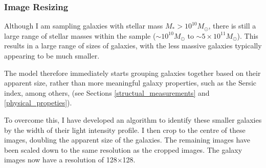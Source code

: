 \documentclass[12pt, onecolumn]{article}
\begin{document}
            
    
        \subsubsection{Image Resizing}
        

            Although I am sampling galaxies with stellar mass $M_{*} > 10^{10} M_{\odot}$, there is still a large range of stellar masses within the sample ($\sim 10^{10} M_{\odot}$ to $\sim 5\times10^{11} M_{\odot}$). This results in a large range of sizes of galaxies, with the less massive galaxies typically appearing to be much smaller.

            The model therefore immediately starts grouping galaxies together based on their apparent size, rather than more meaningful galaxy properties, such as the Sersic index, among others, (see Sections \ref{structual_measurements} and \ref{physical_propeties}).

            To overcome this, I have developed an algorithm to identify these smaller galaxies by the width of their light intensity profile. I then crop to the centre of these images, doubling the apparent size of the galaxies. The remaining images have been scaled down to the same resolution as the cropped images. The galaxy images now have a resolution of 128$\times$128.


            


\end{document}

